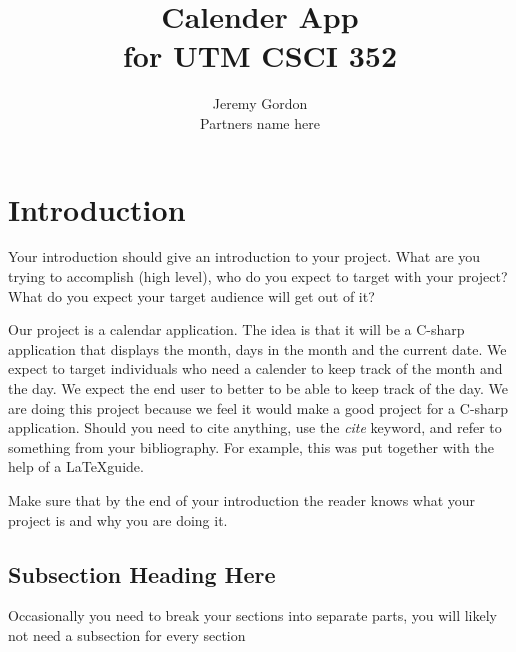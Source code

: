 \documentclass[10pt,conference,onecolumn,compsoc]{IEEEtran}
\begin{document}
\title{Calender App\\ for UTM CSCI 352}
%
%


\author{Jeremy Gordon\\ Partners name here%
}



\maketitle



\IEEEdisplaynontitleabstractindextext

\IEEEpeerreviewmaketitle



\section{Introduction}



Your introduction should give an introduction to your project.  What are you trying to accomplish (high level), who do you expect to target with your project?  What do you expect your target audience will get out of it?

Our project is a calendar application. The idea is that it will be a C-sharp application that displays the month, days in the month and the current date.
We expect to target individuals who need a calender to keep track of the month and the day. We expect the end user to better to be able to keep track of the day. We are doing this project because we feel it would make a good project for a C-sharp application. 
Should you need to cite anything, use the \emph{cite} keyword, and refer to something from your bibliography.  For example, this was put together with the help of a \LaTeX guide\cite{IEEEhowto:kopka}.


Make sure that by the end of your introduction the reader knows what your project is and why you are doing it.



\subsection{Subsection Heading Here}
Occasionally you need to break your sections into separate parts, you will likely not need a subsection for every section
\end{document}
